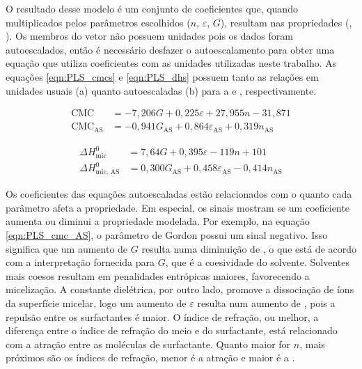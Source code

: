 		O resultado desse modelo é um conjunto de coeficientes que, quando multiplicados pelos parâmetros escolhidos (\(n\), \(\varepsilon\), \(G\)), resultam nas propriedades (\cmc, \DHmic). Os membros do vetor não possuem unidades pois os dados foram autoescalados, então é necessário desfazer o autoescalamento para obter uma equação que utiliza coeficientes com as unidades utilizadas neste trabalho. As equações \ref{eqn:PLS_cmcs} e \ref{eqn:PLS_dhs} possuem tanto as relações em unidades usuais (a) quanto autoescaladas (b) para a \cmc{} e \DHmic, respectivamente. %
				
		\begin{subequations}
			\begin{align}
				\textrm{CMC}               & = -7,206G              + 0,225\varepsilon             + 27,955n            - 31,871  \label{eqn:PLS_cmc}     \\
				\textrm{CMC}_{\textrm{AS}} & = -0,941G_\textrm{AS}  + 0,864\varepsilon_\textrm{AS} + 0,319n_\textrm{AS}           \label{eqn:PLS_cmc_AS}
			\end{align}
			\label{eqn:PLS_cmcs}
		\end{subequations}
		
		\begin{subequations}
			\begin{align}
				\Delta H_\textrm{mic}^0     &= 7,64G              + 0,395\varepsilon             - 119n                + 101  \label{eqn:PLS_dh} \\
				\Delta H_\textrm{mic, AS}^0 &= 0,300G_\textrm{AS} + 0,458\varepsilon_\textrm{AS} - 0,414n_\textrm{AS}         \label{eqn:PLS_dh_AS}
			\end{align}
			\label{eqn:PLS_dhs}
		\end{subequations}
		
		Os coeficientes das equações autoescaladas estão relacionados com o quanto cada parâmetro afeta a propriedade. Em especial, os sinais mostram se um coeficiente aumenta ou diminui a propriedade modelada. Por exemplo, na equação \ref{eqn:PLS_cmc_AS}, o parâmetro de Gordon possui um sinal negativo. Isso significa que um aumento de \(G\) resulta numa diminuição de \cmc, o que está de acordo com a interpretação fornecida para \(G\), que é a coesividade do solvente. Solventes mais coesos resultam em penalidades entrópicas maiores, favorecendo a micelização. A constante dielétrica, por outro lado, promove a dissociação de íons da superfície micelar, logo um aumento de \(\varepsilon\) resulta num aumento de \cmc, pois a repulsão entre os surfactantes é maior. O índice de refração, ou melhor, a diferença entre o índice de refração do meio e do surfactante, está relacionado com a atração entre as moléculas de surfactante. Quanto maior for \(n\), mais próximos são os índices de refração, menor é a atração e maior é a \cmc.
		
